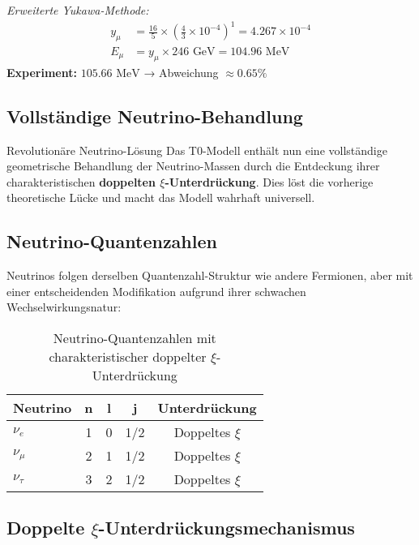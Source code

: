 \documentclass[12pt,a4paper]{article}
\begin{document}
	\textit{Erweiterte Yukawa-Methode:}
	\begin{align}
		y_\mu &= \frac{16}{5} \times \left(\frac{4}{3} \times 10^{-4}\right)^1 = 4.267 \times 10^{-4} \\
		E_\mu &= y_\mu \times 246 \text{ GeV} = 104.96 \text{ MeV}
	\end{align}
	\textbf{Experiment:} $105.66 \text{ MeV}$ → Abweichung $\approx 0.65\%$
	
	\subsection{Vollständige Neutrino-Behandlung}
	\label{sec:complete_neutrino_treatment}
	
	\begin{neutrino}{Revolutionäre Neutrino-Lösung}{}
		Das T0-Modell enthält nun eine vollständige geometrische Behandlung der Neutrino-Massen durch die Entdeckung ihrer charakteristischen \textbf{doppelten $\xi$-Unterdrückung}. Dies löst die vorherige theoretische Lücke und macht das Modell wahrhaft universell.
	\end{neutrino}
	
	\subsection{Neutrino-Quantenzahlen}
	\label{subsec:neutrino_quantum_numbers}
	
	Neutrinos folgen derselben Quantenzahl-Struktur wie andere Fermionen, aber mit einer entscheidenden Modifikation aufgrund ihrer schwachen Wechselwirkungsnatur:
	
	\begin{table}[H]
		\centering
		\begin{tabular}{lcccc}
			\toprule
			\textbf{Neutrino} & \textbf{n} & \textbf{l} & \textbf{j} & \textbf{Unterdrückung} \\
			\midrule
			$\nu_e$ & 1 & 0 & 1/2 & Doppeltes $\xi$ \\
			$\nu_\mu$ & 2 & 1 & 1/2 & Doppeltes $\xi$ \\
			$\nu_\tau$ & 3 & 2 & 1/2 & Doppeltes $\xi$ \\
			\bottomrule
		\end{tabular}
		\caption{Neutrino-Quantenzahlen mit charakteristischer doppelter $\xi$-Unterdrückung}
		\label{tab:neutrino_quantum_numbers}
	\end{table}
	
	\subsection{Doppelte $\xi$-Unterdrückungsmechanismus}
	\label{subsec:double_xi_suppression}
	
\end{document}
